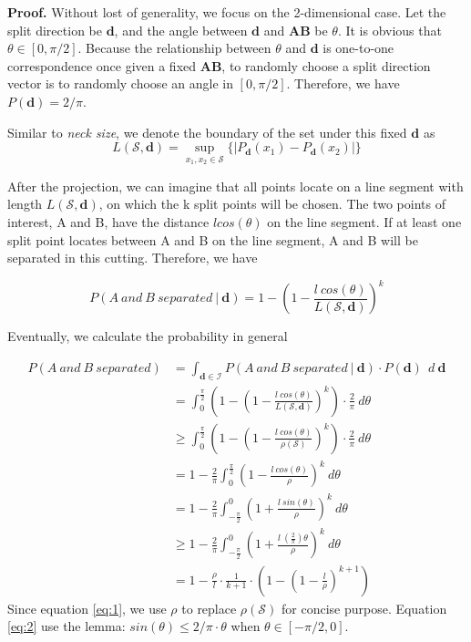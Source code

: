 \textbf{Proof.} Without lost of generality, we focus on the 2-dimensional case. Let the split direction be $\mathbf{d}$, and the angle between $\mathbf{d}$ and $\mathbf{AB}$ be $\theta$. It is obvious that $\theta \in [0, \pi/2]$. Because the relationship between $\theta$ and $\mathbf{d}$ is one-to-one correspondence once given a fixed $\mathbf{AB}$, to randomly choose a split direction vector is to randomly choose an angle in $[0, \pi/2]$. Therefore, we have $P(\mathbf{d}) = 2/\pi$.

Similar to \textit{neck size}, we denote the boundary of the set under this fixed $\mathbf{d}$ as
\begin{equation}
\nonumber
    L(\mathcal{S}, \mathbf{d}) = \sup_{x_1, x_2 \in \mathcal{S}}\{|P_{\mathbf{d}}(x_1) - P_{\mathbf{d}}(x_2)|\}
\end{equation}

After the projection, we can imagine that all points locate on a line segment with length $L(\mathcal{S}, \mathbf{d})$, on which the k split points will be chosen. The two points of interest, A and B, have the distance $l cos(\theta)$ on the line segment. If at least one split point locates between A and B on the line segment, A and B will be separated in this cutting. Therefore, we have

\begin{equation}
\nonumber
    P(A\ and\ B\ separated\ |\ \mathbf{d}) = 1 - (1 - \frac{l\ cos(\theta)}{L(\mathcal{S}, \mathbf{d})})^{k}
\end{equation}

Eventually, we calculate the probability in general

\begin{align}
\nonumber
    P(A\ and\ B\ separated) & = \int_{\mathbf{d} \in \mathcal{I}} P(A\ and\ B\ separated\ |\ \mathbf{d}) \cdot P(\mathbf{d}) \ \ d\ \mathbf{d}\\
\nonumber
    & = \int_{0}^{\frac{\pi}{2}} (1 - (1 - \frac{l\ cos(\theta)}{L(\mathcal{S}, \mathbf{d})})^{k}) \cdot \frac{2}{\pi} \ d\theta\\
\nonumber
    & \ge \int_{0}^{\frac{\pi}{2}} (1 - (1 - \frac{l\ cos(\theta)}{\rho(\mathcal{S})})^{k}) \cdot \frac{2}{\pi} \ d\theta\\
    & = 1 - \frac{2}{\pi} \int_{0}^{\frac{\pi}{2}} (1 - \frac{l\ cos(\theta)}{\rho})^{k} \ d\theta \label{eq:1} \\
\nonumber
    & = 1 - \frac{2}{\pi} \int_{-\frac{\pi}{2}}^{0} (1 + \frac{l\ sin(\theta)}{\rho})^{k} \ d\theta\\
    & \ge 1 - \frac{2}{\pi} \int_{-\frac{\pi}{2}}^{0} (1 + \frac{l\ (\frac{2}{\pi}) \theta}{\rho})^{k} \ d\theta \label{eq:2}\\
\nonumber
    & = 1 - \frac{\rho}{l} \cdot \frac{1}{k+1} \cdot (1 - (1 - \frac{l}{\rho})^{k+1})
\end{align}
Since equation \ref{eq:1}, we use $\rho$ to replace $\rho(\mathcal{S})$ for concise purpose. Equation \ref{eq:2} use the lemma: $sin(\theta) \le 2/\pi \cdot \theta$ when $\theta \in [-\pi/2, 0]$.


